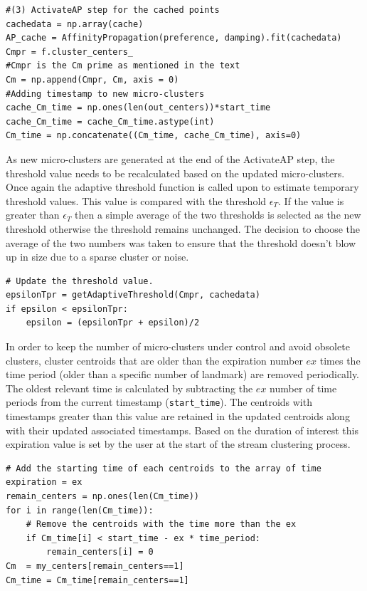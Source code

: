 \documentclass[../UNBThesis2.tex]{subfiles}
\begin{document}
\begin{lstlisting}
#(3) ActivateAP step for the cached points
cachedata = np.array(cache)        
AP_cache = AffinityPropagation(preference, damping).fit(cachedata)
Cmpr = f.cluster_centers_
#Cmpr is the Cm prime as mentioned in the text
Cm = np.append(Cmpr, Cm, axis = 0)
#Adding timestamp to new micro-clusters  
cache_Cm_time = np.ones(len(out_centers))*start_time
cache_Cm_time = cache_Cm_time.astype(int)
Cm_time = np.concatenate((Cm_time, cache_Cm_time), axis=0)
\end{lstlisting}


As new micro-clusters are generated at the end of the ActivateAP step, the threshold value needs to be recalculated based on the updated micro-clusters. Once again the adaptive threshold function is called upon to estimate temporary threshold values. This value is compared with the threshold $\epsilon_T$. If the value is greater than $\epsilon_T$ then a simple average of the two thresholds is selected as the new threshold otherwise the threshold remains unchanged. The decision to choose the average of the two numbers was taken to ensure that the threshold doesn't blow up in size due to a sparse cluster or noise.
\begin{lstlisting}
# Update the threshold value.
epsilonTpr = getAdaptiveThreshold(Cmpr, cachedata)
if epsilon < epsilonTpr:
    epsilon = (epsilonTpr + epsilon)/2  
\end{lstlisting}

In order to keep the number of micro-clusters under control and avoid obsolete clusters, cluster centroids that are older than the expiration number $ex$ times the time period (older than a specific number of landmark) are removed periodically. The oldest relevant time is calculated by subtracting the $ex$ number of time periods from the current timestamp (\texttt{start\_time}). The centroids with timestamps greater than this value are retained in the updated centroids along with their updated associated timestamps. Based on the duration of interest this expiration value is set by the user at the start of the stream clustering process. 



\begin{lstlisting}
# Add the starting time of each centroids to the array of time
expiration = ex
remain_centers = np.ones(len(Cm_time))
for i in range(len(Cm_time)):
    # Remove the centroids with the time more than the ex
    if Cm_time[i] < start_time - ex * time_period:
        remain_centers[i] = 0
Cm  = my_centers[remain_centers==1]
Cm_time = Cm_time[remain_centers==1]
\end{lstlisting}
\end{document}
